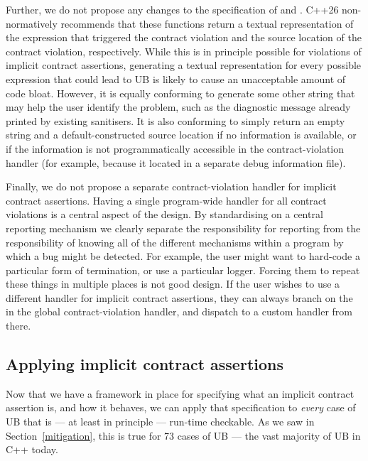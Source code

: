 Further, we do not propose any changes to the specification of  and . C++26 non-normatively recommends that these functions return a textual representation of the expression that triggered the contract violation and the source location of the contract violation, respectively. While this is in principle possible for violations of implicit contract assertions, generating a textual representation for every possible expression that could lead to UB is likely to cause an unacceptable amount of code bloat. However, it is equally conforming to generate some other string that may help the user identify the problem, such as the diagnostic message already printed by existing sanitisers. It is also conforming to simply return an empty string and a default-constructed source location if no information is available, or if the information is not programmatically accessible in the contract-violation handler (for example,
because it located in a separate debug information file). 

Finally, we do not propose a separate contract-violation handler for implicit contract assertions. Having a single program-wide handler for all contract violations is a central aspect of the \cite{P2900R14} design. By standardising on a central reporting mechanism we clearly separate the responsibility for reporting from the responsibility of knowing all of the different mechanisms within a program by which a bug might be detected. For example, the user might want to hard-code a particular form of termination, or use a particular logger. Forcing them to repeat these things in multiple places is not good design. If the user  wishes to use a different handler for implicit contract assertions, they can always branch on the  in the global contract-violation handler, and dispatch to a custom handler from there.

\subsection{Applying implicit contract assertions}
\label{applyicas}

Now that we have a framework in place for specifying what an implicit contract assertion is, and how it behaves, we can apply that specification to \emph{every} case of UB  that is --- at least in principle --- run-time checkable. As we saw in Section~\ref{mitigation}, this is true for 73 cases of UB --- the vast majority of UB in C++ today.


